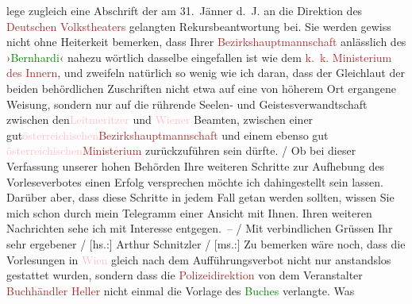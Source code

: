 {{{                        lege zugleich eine Abschrift der am 31. Jänner d. J. an die
                        Direktion des \textcolor{brown}{Deutschen Volkstheaters}
                        gelangten Rekursbeantwortung bei. Sie werden gewiss nicht ohne Heiterkeit
                        bemerken, dass Ihrer \textcolor{brown}{Bezirkshauptmannschaft} anlässlich des ›\textcolor{green}{Bernhardi}‹ nahezu wörtlich dasselbe eingefallen ist
                        wie dem \textcolor{brown}{k. k. Ministerium des Innern},
                        und zweifeln natürlich so wenig wie ich daran, dass der Gleichlaut der
                        beiden behördlichen Zuschriften nicht etwa auf eine von höherem Ort
                        ergangene Weisung, sondern nur auf die rührende Seelen- und
                        Geistesverwandtschaft zwischen den\textcolor{pink}{Leitmeritzer} und \textcolor{pink}{Wiener} Beamten,
                        zwischen einer gut\textcolor{pink}{österreichischen}\textcolor{brown}{Bezirkshauptmannschaft} und einem ebenso gut \textcolor{pink}{österreichischen}\textcolor{brown}{Ministerium}
                        zurückzuführen sein dürfte.{ / }Ob bei dieser Verfassung unserer hohen
                        Behörden Ihre weiteren Schritte zur Aufhebung des Vorleseverbotes einen
                        Erfolg versprechen möchte ich dahingestellt sein lassen. Darüber aber, dass
                        diese Schritte in jedem Fall getan werden sollten, wissen Sie mich schon
                        durch mein Telegramm einer Ansicht mit Ihnen. Ihren weiteren Nachrichten
                        sehe ich mit Interesse entgegen. –{ / }Mit verbindlichen Grüssen Ihr sehr ergebener{ / }{[}hs.:{]} Arthur Schnitzler { / }{[}ms.:{]} Zu bemerken wäre noch, dass die Vorlesungen
                        in \textcolor{pink}{Wien} gleich nach dem Aufführungsverbot
                        nicht nur anstandslos gestattet wurden, sondern dass die \textcolor{brown}{Polizeidirektion} von dem Veranstalter \textcolor{brown}{Buchhändler Heller} nicht einmal die Vorlage des \textcolor{green}{Buches} verlangte. Was
}}}
